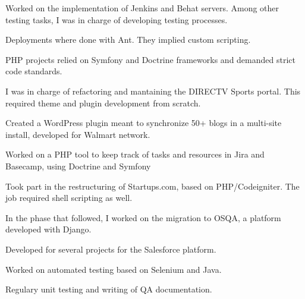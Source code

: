 \documentclass[]{deedy-resume-openfont}
\begin{document}
\begin{minipage}[t]{0.66\textwidth}

\begin{tightemize}
\item Worked on the implementation of Jenkins and Behat servers. Among other testing tasks, I was in charge of developing testing processes.
\item Deployments where done with Ant. They implied custom scripting.
\item PHP projects relied on Symfony and Doctrine frameworks and demanded strict code standards.
\end{tightemize}

\sectionsep



\begin{tightemize}
\item I was in charge of refactoring and mantaining the DIRECTV Sports portal. This required theme and plugin development from scratch.
\item Created a WordPress plugin meant to synchronize 50+ blogs in a multi-site install, developed for Walmart network.
\item Worked on a PHP tool to keep track of tasks and resources in Jira and Basecamp, using Doctrine and Symfony
\end{tightemize}

\sectionsep



\begin{tightemize}
\item Took part in the restructuring of Startups.com, based on PHP/Codeigniter. The job required shell scripting as well.
\item In the phase that followed, I worked on the migration to OSQA, a platform developed with Django.
\end{tightemize}

\sectionsep



\begin{tightemize}
\item Developed for several projects for the Salesforce platform.
\item Worked on automated testing based on Selenium and Java.
\item Regulary unit testing and writing of QA documentation.
\end{tightemize}
\sectionsep

\end{minipage} 
\end{document}
